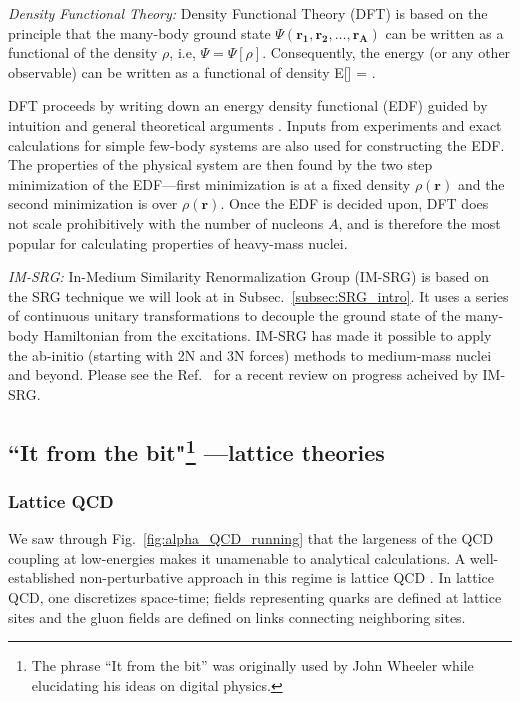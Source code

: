 	\li
	\emph{Density Functional Theory:} Density Functional Theory (DFT) is based
	on the principle that the many-body ground state $\Psi(\bm{r_1}, \bm{r_2},
	\ldots, \bm{r_A})$ can be written as a functional of the density $\rho$,
	i.e, $\Psi = \Psi[\rho]$.
	Consequently, the energy (or any other observable) can be written
	as a functional of density
	\beq
	E[\rho] =  \;.
	\eeq

	DFT proceeds by writing down an energy density functional (EDF) guided by
	intuition and general theoretical arguments
	\cite{Drut:2009ce, Dobaczewski:2010gr}.  Inputs from experiments
	and exact calculations for simple few-body systems are also used for
	constructing the EDF.  The properties of the physical system are then found
	by the two step minimization of the EDF---first minimization is at a fixed
	density $\rho(\bm{r})$ and the second minimization is over $\rho(\bm{r})$.
	Once the EDF is decided upon, DFT does not scale prohibitively with
	the number of nucleons $A$, and is therefore the most popular for
	calculating properties of heavy-mass nuclei.

	\li
	\emph{IM-SRG:} In-Medium Similarity Renormalization Group (IM-SRG) is
	based on the SRG technique we will look at in Subsec.~\ref{subsec:SRG_intro}.
	It uses a series of continuous unitary transformations to decouple
	the ground state of the many-body Hamiltonian from the excitations.
	IM-SRG has made it possible to apply the ab-initio (starting with 2N and
	3N forces) methods to medium-mass nuclei and beyond.  Please see the
	Ref.~\cite{Hergert:2015awm} for a recent review on progress acheived by
	IM-SRG.
	\ei

	\subsection[``It from the bit"---lattice theories]%
	{``It from the bit"\footnote{The phrase ``It from the bit'' was originally
	used by John Wheeler while elucidating his ideas on digital physics.}
	---lattice theories}
	\label{subsec:lattice_theories}

	\medskip
	\subsubsection{Lattice QCD}

	We saw through Fig.~\ref{fig:alpha_QCD_running} that the largeness of the
	QCD coupling at low-energies makes it unamenable to analytical calculations.
	A well-established non-perturbative approach in this regime is lattice
	QCD \cite{Savage:2015eya}.  In lattice QCD, one discretizes space-time;
	fields representing quarks are defined at lattice sites and
	the gluon fields are defined on links connecting neighboring sites.


